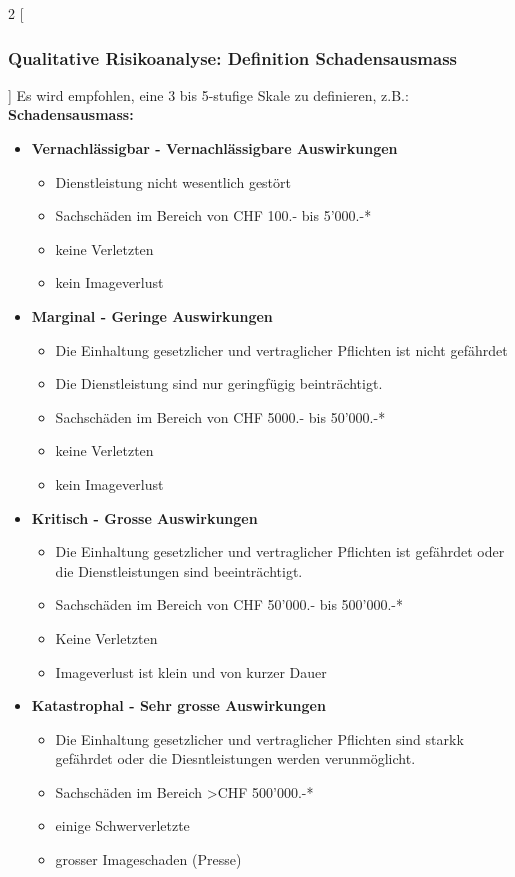 \documentclass[10pt,a4paper]{article}
\begin{document}
\begin{multicols}{2}
[\subsubsection*{Qualitative Risikoanalyse: Definition Schadensausmass}] Es wird empfohlen, eine 3 bis 5-stufige Skale zu definieren, z.B.: \\
\textbf{Schadensausmass:}
\begin{itemize}[noitemsep,topsep=0pt,leftmargin=*]
    \item \textbf{Vernachlässigbar - Vernachlässigbare Auswirkungen}
    \begin{itemize}[noitemsep,topsep=0pt,leftmargin=*]
        \item Dienstleistung nicht wesentlich gestört
        \item Sachschäden im Bereich von CHF 100.- bis 5'000.-*
        \item keine Verletzten
        \item kein Imageverlust
    \end{itemize}
    \item \textbf{Marginal - Geringe Auswirkungen}
    \begin{itemize}[noitemsep,topsep=0pt,leftmargin=*]
        \item Die Einhaltung gesetzlicher und vertraglicher Pflichten ist nicht gefährdet
        \item Die Dienstleistung sind nur geringfügig beinträchtigt.
        \item Sachschäden im  Bereich von CHF 5000.- bis 50'000.-*
        \item keine Verletzten
        \item kein Imageverlust
    \end{itemize}
    \item \textbf{Kritisch - Grosse Auswirkungen}
    \begin{itemize}[noitemsep,topsep=0pt,leftmargin=*]
        \item Die Einhaltung gesetzlicher und vertraglicher Pflichten ist gefährdet oder die Dienstleistungen sind beeinträchtigt.
        \item Sachschäden im Bereich von CHF 50'000.- bis  500'000.-*
        \item Keine Verletzten
        \item Imageverlust ist klein und von kurzer Dauer
    \end{itemize}
    \item \textbf{Katastrophal - Sehr grosse Auswirkungen}
    \begin{itemize}[noitemsep,topsep=0pt,leftmargin=*]
        \item Die Einhaltung gesetzlicher und vertraglicher Pflichten sind starkk gefährdet oder die Diesntleistungen werden verunmöglicht.
        \item Sachschäden im Bereich \textgreater CHF 500'000.-*
        \item einige Schwerverletzte
        \item grosser Imageschaden (Presse)
    \end{itemize}
\end{itemize}


\end{multicols}
\end{document}
